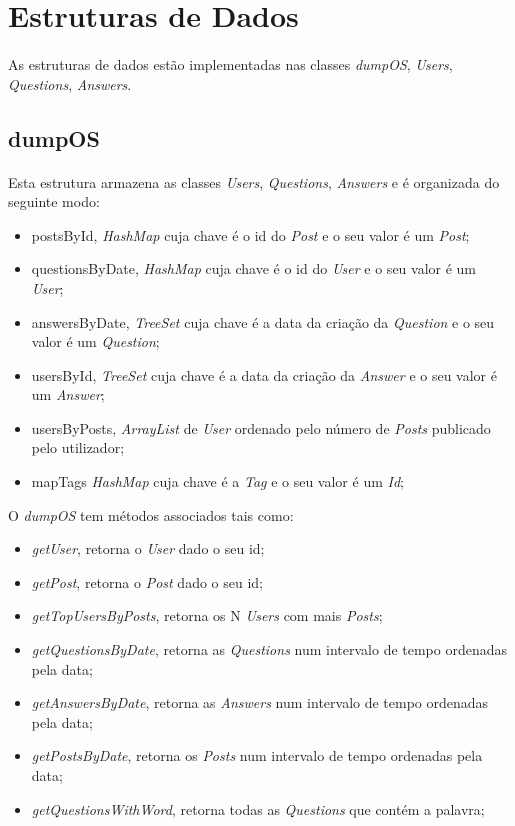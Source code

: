 \documentclass[a4paper, 10pt]{article}
\begin{document}
\section{Estruturas de Dados}
\label{sec:ED}

\paragraph{ }

As estruturas de dados estão implementadas nas classes \emph{dumpOS}, \emph{Users}, \emph{Questions}, \emph{Answers}.

\subsection{dumpOS}
\label{sssec:dumpOS}

\paragraph{ }

Esta estrutura armazena as classes \emph{Users}, \emph{Questions}, \emph{Answers} e é organizada do seguinte modo:
\begin{itemize}
    \item postsById, \emph{HashMap} cuja chave é o id do \emph{Post} e o seu valor é um \emph{Post};
    \item questionsByDate, \emph{HashMap} cuja chave é o id do \emph{User} e o seu valor é um \emph{User};
    \item answersByDate, \emph{TreeSet} cuja chave é a data da criação da \emph{Question} e o seu valor é um \emph{Question};
    \item usersById, \emph{TreeSet} cuja chave é a data da criação da \emph{Answer} e o seu valor é um \emph{Answer};
    \item usersByPosts, \emph{ArrayList} de \emph{User} ordenado pelo número de \emph{Posts} publicado pelo utilizador;
    \item mapTags \emph{HashMap} cuja chave é a \emph{Tag} e o seu valor é um \emph{Id};
\end{itemize}

O \emph{dumpOS} tem métodos associados tais como:
\begin{itemize}
	\item \emph{getUser}, retorna o \emph{User} dado o seu id;
	\item \emph{getPost}, retorna o \emph{Post} dado o seu id;
	\item \emph{getTopUsersByPosts}, retorna os N \emph{Users} com mais \emph{Posts};
	\item \emph{getQuestionsByDate}, retorna as \emph{Questions} num intervalo de tempo ordenadas pela data;
	\item \emph{getAnswersByDate}, retorna as \emph{Answers} num intervalo de tempo ordenadas pela data;
	\item \emph{getPostsByDate}, retorna os \emph{Posts} num intervalo de tempo ordenadas pela data;
	\item \emph{getQuestionsWithWord}, retorna todas as \emph{Questions} que contém a palavra;
\end{itemize}
\end{document}
